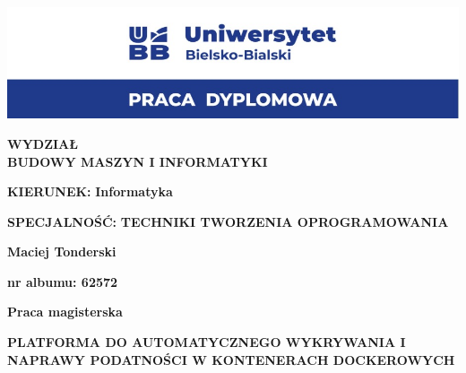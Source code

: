 \begin{titlepage}
    \begin{center}
    
    \includegraphics[width=1\textwidth]{images/logo.jpg} %
    
    \vspace{1cm}
    
    
    \textbf{\large WYDZIAŁ} \\
    \textbf{\large BUDOWY MASZYN I INFORMATYKI} \\
    
    \vspace{0.3cm}
    
    \textbf{\large KIERUNEK:} \textbf{Informatyka} \\
    
    \vspace{0.3cm}
    
    \textbf{\large SPECJALNOŚĆ:} \textbf{TECHNIKI TWORZENIA OPROGRAMOWANIA}
    
    \vspace{2cm}
    
    \textbf{\Large Maciej Tonderski} \\
    
    \vspace{0.5cm}
    
    \textbf{nr albumu:  62572} \\
    
    \vspace{0.5cm}
    
    \textbf{\large Praca magisterska}
    
    \vspace{1.5cm}
    
    \textbf{\LARGE PLATFORMA DO AUTOMATYCZNEGO WYKRYWANIA I
    NAPRAWY PODATNOŚCI W KONTENERACH DOCKEROWYCH} \\
    
    \vspace{0.5cm}
    

\end{center}
\end{titlepage}
